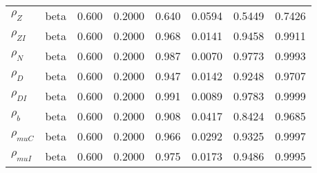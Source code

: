 \begin{center}
\begin{longtable}{llcccccc}
${\rho_Z}$ & beta &   0.600 & 0.2000 &   0.640& 0.0594 &  0.5449 &  0.7426 \\ 
${\rho_{ZI}}$ & beta &   0.600 & 0.2000 &   0.968& 0.0141 &  0.9458 &  0.9911 \\ 
${\rho_N}$ & beta &   0.600 & 0.2000 &   0.987& 0.0070 &  0.9773 &  0.9993 \\ 
${\rho_D}$ & beta &   0.600 & 0.2000 &   0.947& 0.0142 &  0.9248 &  0.9707 \\ 
${\rho_{DI}}$ & beta &   0.600 & 0.2000 &   0.991& 0.0089 &  0.9783 &  0.9999 \\ 
${\rho_b}$ & beta &   0.600 & 0.2000 &   0.908& 0.0417 &  0.8424 &  0.9685 \\ 
${\rho_{muC}}$ & beta &   0.600 & 0.2000 &   0.966& 0.0292 &  0.9325 &  0.9997 \\ 
${\rho_{muI}}$ & beta &   0.600 & 0.2000 &   0.975& 0.0173 &  0.9486 &  0.9995 \\ 
\end{longtable}
 \end{center}
